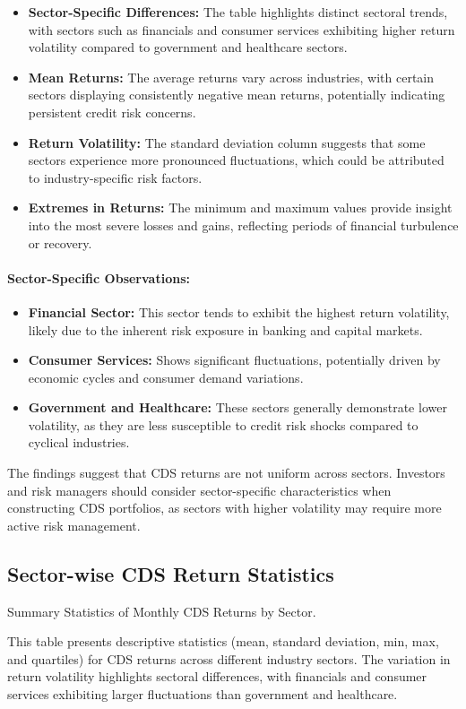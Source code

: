 \documentclass{article}
\begin{document}
\begin{itemize}
    \item \textbf{Sector-Specific Differences:} The table highlights distinct sectoral trends, with sectors such as financials and consumer services exhibiting higher return volatility compared to government and healthcare sectors.
    \item \textbf{Mean Returns:} The average returns vary across industries, with certain sectors displaying consistently negative mean returns, potentially indicating persistent credit risk concerns.
    \item \textbf{Return Volatility:} The standard deviation column suggests that some sectors experience more pronounced fluctuations, which could be attributed to industry-specific risk factors.
    \item \textbf{Extremes in Returns:} The minimum and maximum values provide insight into the most severe losses and gains, reflecting periods of financial turbulence or recovery.
\end{itemize}

\paragraph{Sector-Specific Observations:}
\begin{itemize}
    \item \textbf{Financial Sector:} This sector tends to exhibit the highest return volatility, likely due to the inherent risk exposure in banking and capital markets.
    \item \textbf{Consumer Services:} Shows significant fluctuations, potentially driven by economic cycles and consumer demand variations.
    \item \textbf{Government and Healthcare:} These sectors generally demonstrate lower volatility, as they are less susceptible to credit risk shocks compared to cyclical industries.
\end{itemize}

The findings suggest that CDS returns are not uniform across sectors. Investors and risk managers should consider sector-specific characteristics when constructing CDS portfolios, as sectors with higher volatility may require more active risk management.

\subsection{Sector-wise CDS Return Statistics}

\begin{table}
    \caption{Summary Statistics of Monthly CDS Returns by Sector. }
    \centering
    
    \caption*{
        This table presents descriptive statistics (mean, standard deviation, min, max, and quartiles) 
        for CDS returns across different industry sectors. The variation in return volatility highlights sectoral differences, 
        with financials and consumer services exhibiting larger fluctuations than government and healthcare.
    }
    \label{table:latex_cds_by_sector_stats.tex}
    \end{table}
\end{document}
